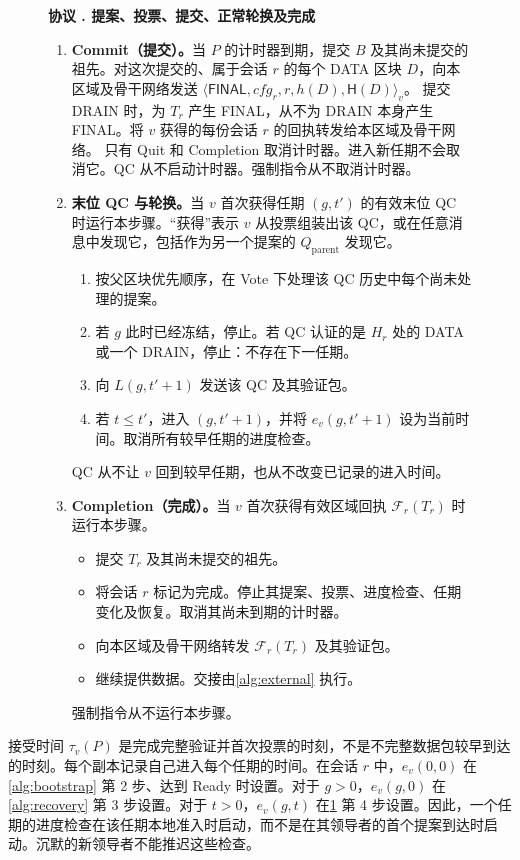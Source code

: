 \documentclass[11pt,a4paper]{article}
\newcommand{\RR}[1]{{\color{rrRed}#1}}
\newcommand{\FC}{\mathcal F}
\newcommand{\Hash}{\mathsf H}
\newcommand{\tagg}[1]{\ensuremath{\mathsf{#1}}}
\newcounter{protocol}
\newenvironment{protocol}[2]{\begin{figure}[htbp]\refstepcounter{protocol}\label{#1}
\begin{mdframed}[linewidth=.6pt,skipabove=0pt,skipbelow=0pt,
innertopmargin=7pt,innerbottommargin=7pt]\small
\textbf{协议 \theprotocol. #2}\par\smallskip}{\end{mdframed}\end{figure}}
\begin{document}
\begin{protocol}{alg:steady}{提案、投票、提交、正常轮换\RR{及完成}}
\begin{enumerate}[label=\textbf{\arabic*)},itemsep=3pt]
\item \textbf{Commit（提交）。}当 $P$ 的计时器到期，提交 $B$ 及其尚未提交的祖先。\RR{对这次提交的、属于会话 $r$ 的每个 DATA 区块 $D$，向本区域及骨干网络发送
$\langle\tagg{FINAL},\mathit{cfg}_r,r,h(D),\Hash(D)\rangle_v$。
提交 DRAIN 时，为 $T_r$ 产生 FINAL，从不为 DRAIN 本身产生 FINAL。将 $v$ 获得的每份会话 $r$ 的回执转发给本区域及骨干网络。}
只有 Quit \RR{和 Completion} 取消计时器。进入新任期不会取消它。QC 从不启动计时器。\RR{强制指令从不取消计时器。}

\item \textbf{末位 QC 与轮换。}当 $v$ 首次获得任期 $(g,t')$ 的有效末位 QC 时运行本步骤。“获得”表示 $v$ 从投票组装出该 QC，或在任意消息中发现它，包括作为另一个提案的 $Q_{\mathrm{parent}}$ 发现它。
\begin{enumerate}[label=(\alph*)]
\item 按父区块优先顺序，在 Vote 下处理该 QC 历史中每个尚未处理的提案。
\item 若 $g$ 此时已经冻结，停止。\RR{若 QC 认证的是 $H_r$ 处的 DATA 或一个 DRAIN，停止：不存在下一任期。}
\item 向 $L(g,t'+1)$ 发送该 QC 及其验证包。
\item 若 $t\le t'$，进入 $(g,t'+1)$，并将 $e_v(g,t'+1)$ 设为当前时间。取消所有较早任期的进度检查。
\end{enumerate}
QC 从不让 $v$ 回到较早任期，也从不改变已记录的进入时间。

\item \RR{\textbf{Completion（完成）。}当 $v$ 首次获得有效区域回执 $\FC_r(T_r)$ 时运行本步骤。}
\begin{itemize}\color{rrRed}
\item 提交 $T_r$ 及其尚未提交的祖先。
\item 将会话 $r$ 标记为完成。停止其提案、投票、进度检查、任期变化及恢复。取消其尚未到期的计时器。
\item 向本区域及骨干网络转发 $\FC_r(T_r)$ 及其验证包。
\item 继续提供数据。交接由\cref{alg:external} 执行。
\end{itemize}
\RR{强制指令从不运行本步骤。}
\end{enumerate}
\end{protocol}

接受时间 $\tau_v(P)$ 是完成完整验证并首次投票的时刻，不是不完整数据包较早到达的时刻。每个副本记录自己进入每个任期的时间。在会话 $r$ 中，$e_v(0,0)$ 在\cref{alg:bootstrap} 第 2 步、达到 Ready 时设置。对于 $g>0$，$e_v(g,0)$ 在\cref{alg:recovery} 第 3 步设置。对于 $t>0$，$e_v(g,t)$ 在\cref{alg:steady} 第 4 步设置。因此，一个任期的进度检查在该任期本地准入时启动，而不是在其领导者的首个提案到达时启动。沉默的新领导者不能推迟这些检查。
\end{document}
